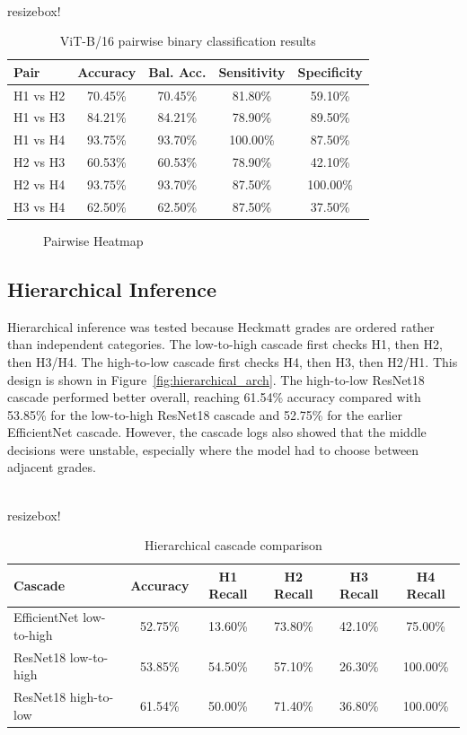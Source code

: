 \begin{table}[H]
\centering
\scriptsize
\\resizebox{\textwidth}{!}{%
\begin{tabular}{lcccc}
\toprule
\textbf{Pair} & \textbf{Accuracy} & \textbf{Bal. Acc.} & \textbf{Sensitivity} & \textbf{Specificity} \\
\midrule
H1 vs H2 & 70.45\% & 70.45\% & 81.80\% & 59.10\% \\
H1 vs H3 & 84.21\% & 84.21\% & 78.90\% & 89.50\% \\
H1 vs H4 & 93.75\% & 93.70\% & 100.00\% & 87.50\% \\
H2 vs H3 & 60.53\% & 60.53\% & 78.90\% & 42.10\% \\
H2 vs H4 & 93.75\% & 93.70\% & 87.50\% & 100.00\% \\
H3 vs H4 & 62.50\% & 62.50\% & 87.50\% & 37.50\% \\
\bottomrule
\end{tabular}}
\caption{ViT-B/16 pairwise binary classification results}
\label{tab:vit_pairwise}
\end{table}

\begin{figure}[H]
    \centering
    \caption{Pairwise Heatmap}
    \label{fig:diagrams}
\end{figure}

\subsection{Hierarchical Inference}
Hierarchical inference was tested because Heckmatt grades are ordered rather than independent categories. The low-to-high cascade first checks H1, then H2, then H3/H4. The high-to-low cascade first checks H4, then H3, then H2/H1. This design is shown in Figure~\ref{fig:hierarchical_arch}. The high-to-low ResNet18 cascade performed better overall, reaching 61.54\% accuracy compared with 53.85\% for the low-to-high ResNet18 cascade and 52.75\% for the earlier EfficientNet cascade. However, the cascade logs also showed that the middle decisions were unstable, especially where the model had to choose between adjacent grades.

\begin{table}[H]
\centering
\scriptsize
\\resizebox{\textwidth}{!}{%
\begin{tabular}{lccccc}
\toprule
\textbf{Cascade} & \textbf{Accuracy} & \textbf{H1 Recall} & \textbf{H2 Recall} & \textbf{H3 Recall} & \textbf{H4 Recall} \\
\midrule
EfficientNet low-to-high & 52.75\% & 13.60\% & 73.80\% & 42.10\% & 75.00\% \\
ResNet18 low-to-high & 53.85\% & 54.50\% & 57.10\% & 26.30\% & 100.00\% \\
ResNet18 high-to-low & 61.54\% & 50.00\% & 71.40\% & 36.80\% & 100.00\% \\
\bottomrule
\end{tabular}}
\caption{Hierarchical cascade comparison}
\label{tab:cascade_comparison}
\end{table}

